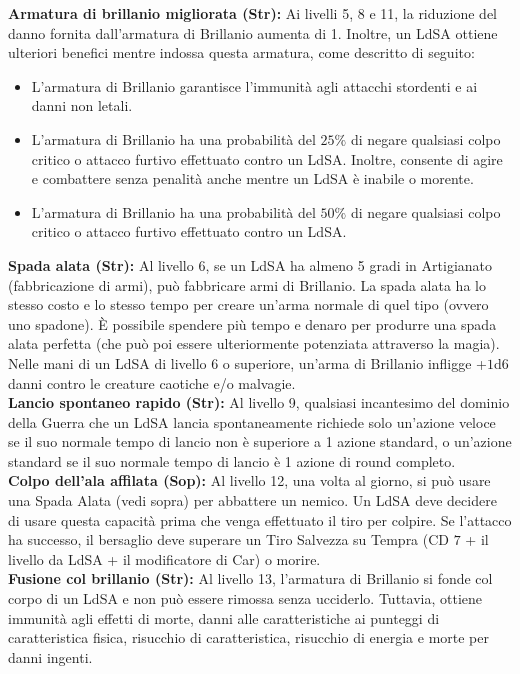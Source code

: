 \documentclass[10pt, a4paper]{report}
\begin{document}
\begin{multicols}{2}
\textbf{Armatura di brillanio migliorata (Str):}  Ai livelli 5, 8 e 11, la riduzione del danno fornita dall’armatura di Brillanio aumenta di 1. Inoltre, un LdSA ottiene ulteriori benefici mentre indossa questa armatura, come descritto di seguito:
\begin{itemize}
	\item L’armatura di Brillanio garantisce l'immunità agli attacchi stordenti e ai danni non letali.
	\item L’armatura di Brillanio ha una probabilità del $25\%$ di negare qualsiasi colpo critico o attacco furtivo effettuato contro un LdSA. Inoltre, consente di agire e combattere senza penalità anche mentre un LdSA è inabile o morente.
	\item L’armatura di Brillanio ha una probabilità del $50\%$ di negare qualsiasi colpo critico o attacco furtivo effettuato contro un LdSA.
\end{itemize}

\textbf{Spada alata (Str):} Al livello 6, se un LdSA ha almeno 5 gradi in Artigianato (fabbricazione di armi), può fabbricare armi di Brillanio. La spada alata ha lo stesso costo e lo stesso tempo per creare un'arma normale di quel tipo (ovvero uno spadone). È possibile spendere più tempo e denaro per produrre una spada alata perfetta (che può poi essere ulteriormente potenziata attraverso la magia). Nelle mani di un LdSA di livello 6 o superiore, un'arma di Brillanio infligge +$1$d$6$ danni contro le creature caotiche e/o malvagie.\\

\textbf{Lancio spontaneo rapido (Str):} Al livello 9, qualsiasi incantesimo del dominio della Guerra che un LdSA lancia spontaneamente richiede solo un'azione veloce se il suo normale tempo di lancio non è superiore a 1 azione standard, o un'azione standard se il suo normale tempo di lancio è 1 azione di round completo.\\

\textbf{Colpo dell'ala affilata (Sop):} Al livello 12, una volta al giorno, si può usare una Spada Alata (vedi sopra) per abbattere un nemico. Un LdSA deve decidere di usare questa capacità prima che venga effettuato il tiro per colpire. Se l'attacco ha successo, il bersaglio deve superare un Tiro Salvezza su Tempra (CD $7$ + il livello da LdSA + il modificatore di Car) o morire.\\

\textbf{Fusione col brillanio (Str):} Al livello 13, l’armatura di Brillanio si fonde col corpo di un LdSA e non può essere rimossa senza ucciderlo. Tuttavia, ottiene immunità agli effetti di morte, danni alle caratteristiche ai punteggi di caratteristica fisica, risucchio di caratteristica, risucchio di energia e morte per danni ingenti.
\end{multicols}
\end{document}
